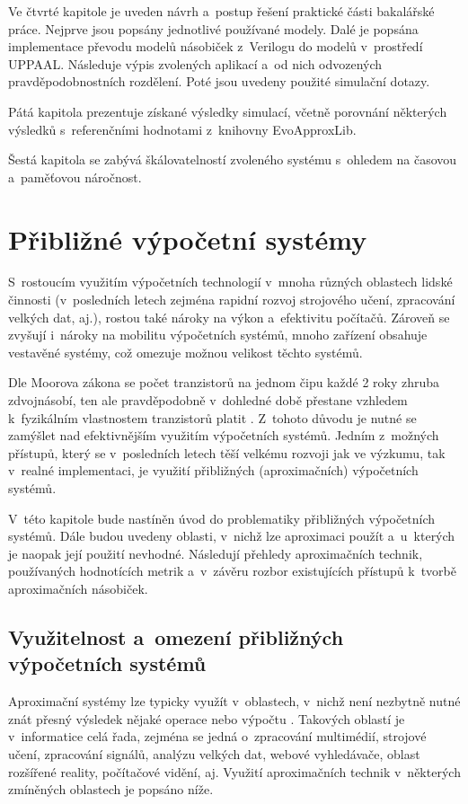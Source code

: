 Ve čtvrté kapitole je uveden návrh a~postup řešení praktické části bakalářské práce. Nejprve jsou popsány jednotlivé používané modely. Dalé je popsána implementace převodu modelů násobiček z~Verilogu do modelů v~prostředí UPPAAL. Následuje výpis zvolených aplikací a~od nich odvozených pravděpodobnostních rozdělení. Poté jsou uvedeny použité simulační dotazy.

Pátá kapitola prezentuje získané výsledky simulací, včetně porovnání některých výsledků s~referenčními hodnotami z~knihovny EvoApproxLib.

Šestá kapitola se zabývá škálovatelností zvoleného systému s~ohledem na časovou a~paměťovou náročnost.

\chapter{Přibližné výpočetní systémy} 
\label{acs}
S~rostoucím využitím výpočetních technologií v~mnoha různých oblastech lidské činnosti (v~posledních letech zejména rapidní rozvoj strojového učení, zpracování velkých dat, aj.), rostou také nároky na výkon a~efektivitu počítačů. Zároveň se zvyšují i~nároky na mobilitu výpočetních systémů, mnoho zařízení obsahuje vestavěné systémy, což omezuje možnou velikost těchto systémů.

Dle Moorova zákona se počet tranzistorů na jednom čipu každé 2 roky zhruba zdvojnásobí, ten ale pravděpodobně v~dohledné době přestane vzhledem k~fyzikálním vlastnostem tranzistorů platit \cite{moore}. Z~tohoto důvodu je nutné se zamýšlet nad efektivnějším využitím výpočetních systémů.
Jedním z~možných přístupů, který se v~posledních letech těší velkému rozvoji jak ve výzkumu, tak v~realné implementaci, je využití přibližných (aproximačních) výpočetních systémů.

V~této kapitole bude nastíněn úvod do problematiky přibližných výpočetních systémů. Dále budou uvedeny oblasti, v~nichž lze aproximaci použít a~u~kterých je naopak její použití nevhodné. Následují přehledy aproximačních technik, používaných hodnotících metrik a~v~závěru rozbor existujících přístupů k~tvorbě aproximačních násobiček.

\section{Využitelnost a~omezení přibližných výpočetních systémů}
Aproximační systémy lze typicky využít v~oblastech, v~nichž není nezbytně nutné znát přesný výsledek nějaké operace nebo výpočtu \cite{emerging_paradigm}. Takových oblastí je v~informatice celá řada, zejména se jedná o~zpracování multimédií, strojové učení, zpracování signálů, analýzu velkých dat, webové vyhledávače, oblast rozšířené reality, počítačové vidění, aj. Využití aproximačních technik v~některých zmíněných oblastech je popsáno níže.

